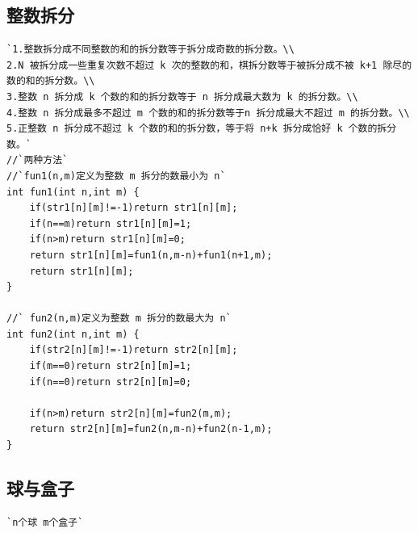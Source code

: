 \documentclass[a4paper]{article}
\begin{document}
\begin{CJK*}{UTF8}{gbsn}
\begin{multicols}{3}
\begin{flushleft}
\subsection{整数拆分}
\begin{lstlisting}
`1.整数拆分成不同整数的和的拆分数等于拆分成奇数的拆分数。\\
2.N 被拆分成一些重复次数不超过 k 次的整数的和，棋拆分数等于被拆分成不被 k+1 除尽的数的和的拆分数。\\
3.整数 n 拆分成 k 个数的和的拆分数等于 n 拆分成最大数为 k 的拆分数。\\
4.整数 n 拆分成最多不超过 m 个数的和的拆分数等于n 拆分成最大不超过 m 的拆分数。\\
5.正整数 n 拆分成不超过 k 个数的和的拆分数，等于将 n+k 拆分成恰好 k 个数的拆分数。`
//`两种方法`
//`fun1(n,m)定义为整数 m 拆分的数最小为 n`
int fun1(int n,int m) {
    if(str1[n][m]!=-1)return str1[n][m];
    if(n==m)return str1[n][m]=1;
    if(n>m)return str1[n][m]=0;
    return str1[n][m]=fun1(n,m-n)+fun1(n+1,m);
    return str1[n][m];
}

//` fun2(n,m)定义为整数 m 拆分的数最大为 n`
int fun2(int n,int m) {
    if(str2[n][m]!=-1)return str2[n][m];
    if(m==0)return str2[n][m]=1;
    if(n==0)return str2[n][m]=0;

    if(n>m)return str2[n][m]=fun2(m,m);
    return str2[n][m]=fun2(n,m-n)+fun2(n-1,m);
}

\end{lstlisting}



\subsection{球与盒子}
\begin{lstlisting}
`n个球 m个盒子`
\end{lstlisting}


\end{flushleft}
\end{multicols}
\end{CJK*}
\end{document}
